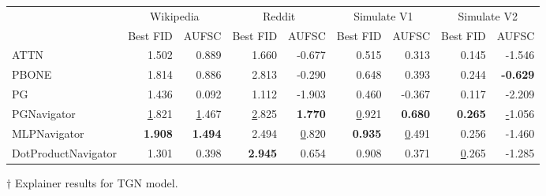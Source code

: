 \begin{tabular}{lrrrrrrrr}
\toprule
 & \multicolumn{2}{c}{Wikipedia} & \multicolumn{2}{c}{Reddit} & \multicolumn{2}{c}{Simulate V1} & \multicolumn{2}{c}{Simulate V2} \\
 & Best FID & AUFSC & Best FID & AUFSC & Best FID & AUFSC & Best FID & AUFSC \\
\midrule
ATTN & 1.502 & 0.889 & 1.660 & -0.677 & 0.515 & 0.313 & 0.145 & -1.546 \\
PBONE & 1.814 & 0.886 & 2.813 & -0.290 & 0.648 & 0.393 & 0.244 & \bfseries -0.629 \\
PG & 1.436 & 0.092 & 1.112 & -1.903 & 0.460 & -0.367 & 0.117 & -2.209 \\
PGNavigator & \underline 1.821 & \underline 1.467 & \underline 2.825 & \bfseries 1.770 & \underline 0.921 & \bfseries 0.680 & \bfseries 0.265 & \underline -1.056 \\
MLPNavigator & \bfseries 1.908 & \bfseries 1.494 & 2.494 & \underline 0.820 & \bfseries 0.935 & \underline 0.491 & 0.256 & -1.460 \\
DotProductNavigator & 1.301 & 0.398 & \bfseries 2.945 & 0.654 & 0.908 & 0.371 & \underline 0.265 & -1.285 \\
\bottomrule
\end{tabular}
\caption{\label{tab:tgn_results}$\dagger$ Explainer results for TGN model.}
